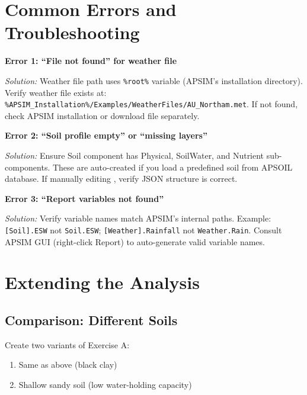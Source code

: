 \section{Common Errors and Troubleshooting}

\begin{warningbox}
\textbf{Error 1: ``File not found'' for weather file}

\textit{Solution:} Weather file path uses \texttt{\%root\%} variable (APSIM's installation directory). Verify weather file exists at: \texttt{\%APSIM\_Installation\%/Examples/WeatherFiles/AU\_Northam.met}. If not found, check APSIM installation or download file separately.
\end{warningbox}

\begin{warningbox}
\textbf{Error 2: ``Soil profile empty'' or ``missing layers''}

\textit{Solution:} Ensure Soil component has Physical, SoilWater, and Nutrient sub-components. These are auto-created if you load a predefined soil from APSOIL database. If manually editing , verify JSON structure is correct.
\end{warningbox}

\begin{warningbox}
\textbf{Error 3: ``Report variables not found''}

\textit{Solution:} Verify variable names match APSIM's internal paths. Example: \texttt{[Soil].ESW} not \texttt{Soil.ESW}; \texttt{[Weather].Rainfall} not \texttt{Weather.Rain}. Consult APSIM GUI (right-click Report) to auto-generate valid variable names.
\end{warningbox}

\section{Extending the Analysis}

\subsection{Comparison: Different Soils}

Create two variants of Exercise A:
\begin{enumerate}
  \item Same as above (black clay)
  \item Shallow sandy soil (low water-holding capacity)
\end{enumerate}

